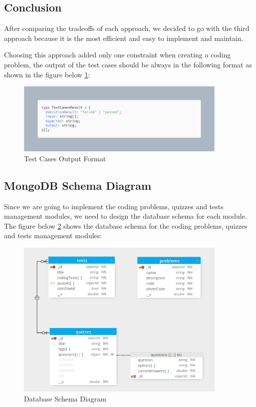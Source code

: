 \newpage
\subsection{Conclusion}
After comparing the tradeoffs of each approach, we decided to go with the third approach because it is the
most efficient and easy to implement and maintain.

Choosing this approach added only one constraint when creating a coding problem, the output of the test cases
should be always in the following format as shown in the figure below \ref{fig:output_format}:

\begin{figure}[h!]
  \centering
  \includegraphics[width=0.9\textwidth]{images/testCasesResult.png}
  \caption{Test Cases Output Format}\label{fig:output_format}
\end{figure}

\newpage
\subsection{MongoDB Schema Diagram}
Since we are going to implement the coding problems, quizzes and tests management modules, we need to design
the database schema for each module. The figure below \ref{fig:db_schema} shows the database schema for the coding problems,
quizzes and tests management modules:

\begin{figure}[h!]
  \centering
  \includegraphics[width=0.9\textwidth]{images/sprint3Schema.png}
  \caption{Database Schema Diagram}\label{fig:db_schema}
\end{figure}

